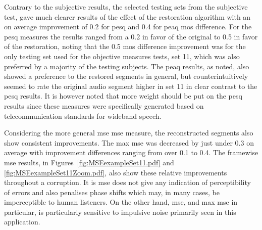 Contrary to the subjective results, the selected testing sets from the subjective test, gave much clearer results of the effect of the restoration algorithm with an on average improvement of 0.2 for \DIFdelbegin {}\DIFdelend \DIFaddbegin \gls{pesq} \DIFaddend and 0.4 for \DIFdelbegin {}\DIFdelend \DIFaddbegin \gls{peaq} \gls{mos} \DIFaddend difference. For the \DIFdelbegin {}\DIFdelend \DIFaddbegin \gls{pesq} \DIFaddend measures the results ranged from a 0.2 in favor of the original to 0.5 in favor of the restoration, noting that the 0.5 \DIFdelbegin {}\DIFdelend \DIFaddbegin \gls{mos} \DIFaddend difference improvement was for the only testing set used for the objective measures tests, set 11, which was also preferred by a majority of the testing subjects. The \DIFdelbegin {}\DIFdelend \DIFaddbegin \gls{peaq} \DIFaddend results, as noted, also showed a preference to the restored segments in general, but counterintuitively seemed to rate the original audio segment higher in set 11 in clear contrast to the \DIFdelbegin {}\DIFdelend \DIFaddbegin \gls{pesq} \DIFaddend results. It is however noted that more weight should be put on the \DIFdelbegin {}\DIFdelend \DIFaddbegin \gls{pesq} \DIFaddend results since these measures were specifically generated based on telecommunication standards for wideband speech.

Considering the more general \DIFdelbegin {}\DIFdelend \DIFaddbegin \gls{mse} \gls{mse} \DIFaddend measure, the reconstructed segments also show consistent improvements. The max \DIFdelbegin {}\DIFdelend \DIFaddbegin \gls{mse} \DIFaddend was decreased by just under 0.3 on average with improvement differences ranging from over 0.1 to 0.4. The framewise \DIFdelbegin {}\DIFdelend \DIFaddbegin \gls{mse} \DIFaddend results, in Figures~\ref{fig:MSEexampleSet11.pdf} and \ref{fig:MSEexampleSet11Zoom.pdf}, also show these relative improvements throughout a corruption. It is \DIFdelbegin {}\DIFdelend \DIFaddbegin {}\gls{mse} \DIFaddend does not give any indication of perceptibility of errors and also penalises phase shifts which may, in many cases, be imperceptible to human listeners. On the other hand, \DIFdelbegin {}\DIFdelend \DIFaddbegin \gls{mse}\DIFaddend , and max \DIFdelbegin {}\DIFdelend \DIFaddbegin \gls{mse} \DIFaddend in particular, is particularly sensitive to impulsive noise primarily seen in this application.

